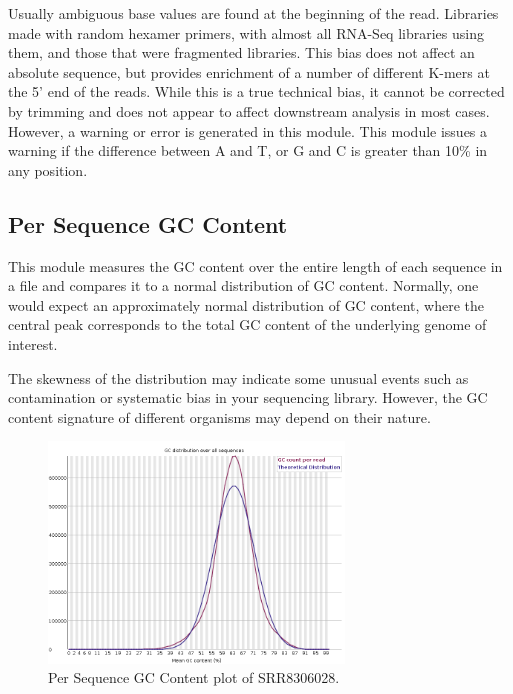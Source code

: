 \documentclass[
  letterpaper,
  DIV=11,
  numbers=noendperiod]{scrreprt}
\begin{document}
Usually ambiguous base values are found at the beginning of the read.
Libraries made with random hexamer primers, with almost all RNA-Seq
libraries using them, and those that were fragmented libraries. This
bias does not affect an absolute sequence, but provides enrichment of a
number of different K-mers at the 5' end of the reads. While this is a
true technical bias, it cannot be corrected by trimming and does not
appear to affect downstream analysis in most cases. However, a warning
or error is generated in this module. This module issues a warning if
the difference between A and T, or G and C is greater than 10\% in any
position.

\hypertarget{per-sequence-gc-content}{%
\subsection{Per Sequence GC Content}\label{per-sequence-gc-content}}

This module measures the GC content over the entire length of each
sequence in a file and compares it to a normal distribution of GC
content. Normally, one would expect an approximately normal distribution
of GC content, where the central peak corresponds to the total GC
content of the underlying genome of interest.

The skewness of the distribution may indicate some unusual events such
as contamination or systematic bias in your sequencing library. However,
the GC content signature of different organisms may depend on their
nature.

\begin{figure}

{\centering \includegraphics[width=0.7\textwidth,height=\textheight]{./assets/25_fqc_gc_content.png}

}

\caption{Per Sequence GC Content plot of SRR8306028.}

\end{figure}
\end{document}
